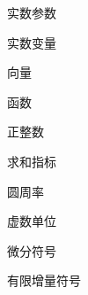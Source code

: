 
\begin{denotation}[2.5cm]
  \item[$a,b$] 实数参数
  \item[$x,y$] 实数变量
  \item[$\symbf{x}$] 向量
  \item[$f$] 函数
  \item[$n$] 正整数
  \item[$k$] 求和指标
  \item[$\uppi$] 圆周率
  \item[$\symup{i}$] 虚数单位
  \item[$\dif$] 微分符号
  \item[$\increment$] 有限增量符号
\end{denotation}
